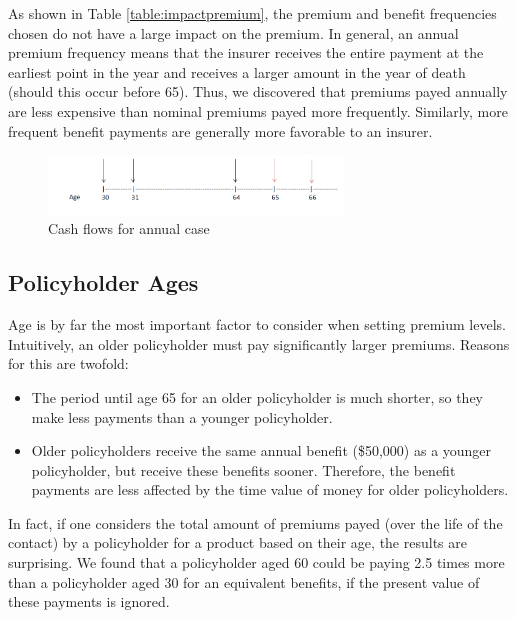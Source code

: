 \documentclass[12pt]{article}
\begin{document}
As shown in Table \ref{table:impactpremium}, the premium and benefit frequencies chosen do not have a large impact on the premium. In general, an annual premium frequency means that the insurer receives the entire payment at the earliest point in the year and receives a larger amount in the year of death (should this occur before 65). Thus, we discovered that premiums payed annually are less expensive than nominal premiums payed more frequently. Similarly, more frequent benefit payments are generally more favorable to an insurer.

\begin{figure}[!ht]
\begin{center}
\includegraphics[width=0.7\textwidth]{images/timeDiagram}
\end{center}
\vspace{-5mm}
\caption{Cash flows for annual case}
\end{figure}

\subsection{Policyholder Ages}

Age is by far the most important factor to consider when setting premium levels. Intuitively, an older policyholder must pay significantly larger premiums. Reasons for this are twofold:

\begin{itemize}
\item The period until age 65 for an older policyholder is much shorter, so they make less payments than a younger policyholder.
\item Older policyholders receive the same annual benefit (\$50,000) as a younger policyholder, but receive these benefits sooner. Therefore, the benefit payments are less affected by the time value of money for older policyholders.
\end{itemize}

In fact, if one considers the total amount of premiums payed (over the life of the contact) by a policyholder for a product based on their age, the results are surprising. We found that a policyholder aged 60 could be paying 2.5 times more than a policyholder aged 30 for an equivalent benefits, if the present value of these payments is ignored. %
\end{document}
